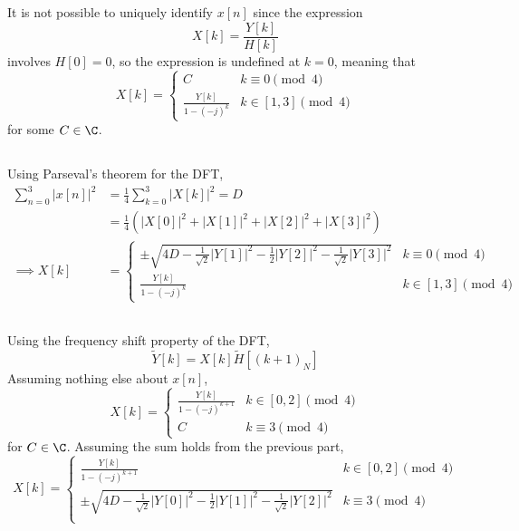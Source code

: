 \documentclass{article}
\begin{document}
\subsection{}

It is not possible to uniquely identify \(x[n]\) since the expression
\begin{equation}
    X[k] = \frac{Y[k]}{H[k]}
\end{equation}
involves \(H[0] = 0\), so the expression is undefined at \(k = 0\), meaning that
\begin{equation}
    X[k] =
    \begin{cases}
        C & k \equiv 0 \pmod{4} \\
        \frac{Y[k]}{1 - (-j)^k} & k \in [1, 3] \pmod{4}
    \end{cases}
\end{equation}
for some \(C \in \C\).

\subsection{}

Using Parseval's theorem for the DFT,
\begin{align}
    \sum_{n = 0}^3 |x[n]|^2 &= \frac{1}{4} \sum_{k = 0}^3 |X[k]|^2 = D \\
    &= \frac{1}{4} \left(|X[0]|^2 + |X[1]|^2 + |X[2]|^2 + |X[3]|^2\right) \\
    \implies X[k] &=
    \begin{cases}
        \pm \sqrt{4D - \frac{1}{\sqrt{2}} |Y[1]|^2 - \frac{1}{2} |Y[2]|^2 - \frac{1}{\sqrt{2}} |Y[3]|^2} & k \equiv 0 \pmod{4} \\
        \frac{Y[k]}{1 - (-j)^k} & k \in [1, 3] \pmod{4}
    \end{cases}
\end{align}

\subsection{}

Using the frequency shift property of the DFT,
\begin{equation}
    \tilde{Y}[k] = X[k] \tilde{H}[(k + 1)_N]
\end{equation}
Assuming nothing else about \(x[n]\),
\begin{equation}
    X[k] =
    \begin{cases}
        \frac{Y[k]}{1 - (-j)^{k + 1}} & k \in [0, 2] \pmod{4} \\
        C & k \equiv 3 \pmod{4}
    \end{cases}
\end{equation}
for \(C \in \C\).
Assuming the sum holds from the previous part,
\begin{equation}
    X[k] =
    \begin{cases}
        \frac{Y[k]}{1 - (-j)^{k + 1}} & k \in [0, 2] \pmod{4} \\
        \pm \sqrt{4D - \frac{1}{\sqrt{2}} |Y[0]|^2 - \frac{1}{2} |Y[1]|^2 - \frac{1}{\sqrt{2}} |Y[2]|^2} & k \equiv 3 \pmod{4} \\
    \end{cases}
\end{equation}
\end{document}
